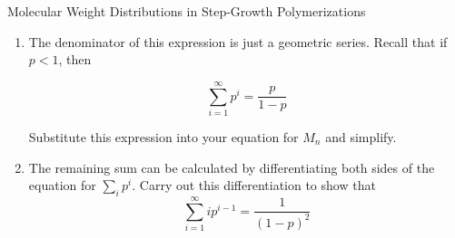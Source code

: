 \begin{activity}{Molecular Weight Distributions in Step-Growth Polymerizations}
\begin{exercises}
\begin{enumerate}
\begin{solution}
{					}\end{solution}
					
				\item The denominator of this expression is just a geometric series.  Recall that if $p < 1$, then 
		
			\begin{equation*}
				\sum_{i=1}^{\infty} p^i = \frac{p}{1-p}
			\end{equation*}
			
					Substitute this expression into your equation for $M_n$ and simplify.
					
					\begin{solution}\end{solution}
			
				\item The remaining sum can be calculated by differentiating both sides of the equation for $\sum_i p^i$.  Carry out this differentiation to show that
						\begin{equation*}
							\sum_{i=1}^{\infty} ip^{i-1} = \frac{1}{(1-p)^2}
						\end{equation*}
				
					\begin{solution}
\end{solution}
\end{enumerate}
\end{exercises}
\end{activity}
